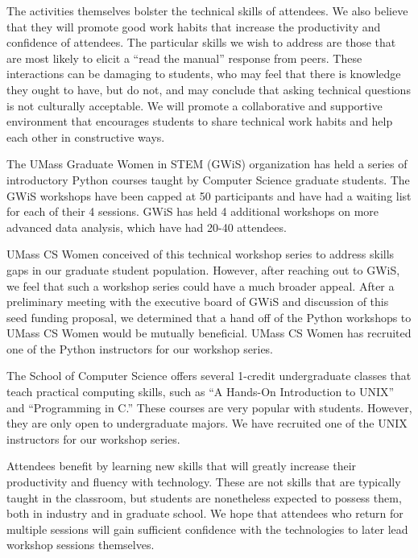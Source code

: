 \documentclass{article}
\begin{document}
The activities themselves bolster the technical skills of attendees. We also believe that they will promote good work habits that increase the productivity and confidence of attendees. The particular skills we wish to address are those that are most likely to elicit a “read the manual” response from peers. These interactions can be damaging to students, who may feel that there is knowledge they ought to have, but do not, and may conclude that asking technical questions is not culturally acceptable. We will promote a collaborative and supportive environment that encourages students to share technical work habits and help each other in constructive ways.


The UMass Graduate Women in STEM (GWiS) organization has held a series of introductory Python courses taught by Computer Science graduate students. The GWiS workshops have been capped at 50 participants and have had a waiting list for each of their 4 sessions.  GWiS has held 4 additional workshops on more advanced data analysis, which have had 20-40 attendees.

UMass CS Women conceived of this technical workshop series to address skills gaps in our graduate student population. However, after reaching out to GWiS, we feel that such a workshop series could have a much broader appeal. After a preliminary meeting with the executive board of GWiS and discussion of this seed funding proposal, we determined that a hand off of the Python workshops to UMass CS Women would be mutually beneficial. UMass CS Women has recruited one of the Python instructors for our workshop series.

The School of Computer Science offers several 1-credit undergraduate classes that teach practical computing skills, such as “A Hands-On Introduction to UNIX” and “Programming in C.” These courses are very popular with students. However, they are only open to undergraduate majors. We have recruited one of the UNIX instructors for our workshop series.


Attendees benefit by learning new skills that will greatly increase their productivity and fluency with technology. These are not skills that are typically taught in the classroom, but students are nonetheless expected to possess them, both in industry and in graduate school. We hope that attendees who return for multiple sessions will gain sufficient confidence with the technologies to later lead workshop sessions themselves.
\end{document}
